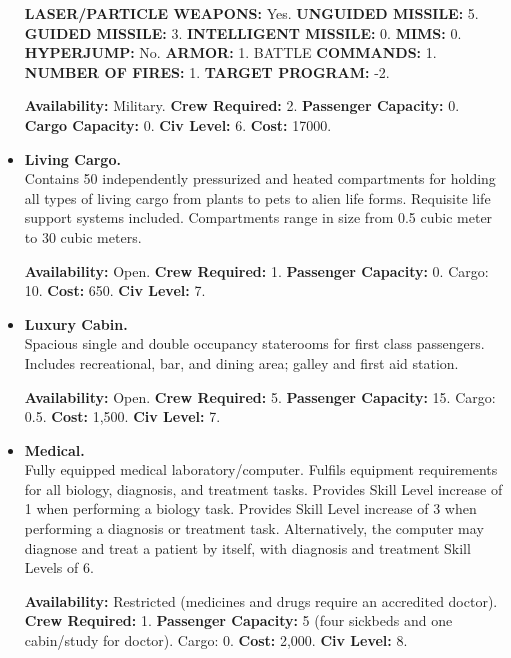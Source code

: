 \begin{itemize}
  \textbf{LASER/PARTICLE WEAPONS:} Yes. \textbf{UNGUIDED MISSILE:} 5.
  \textbf{GUIDED MISSILE:} 3.  \textbf{INTELLIGENT MISSILE:} 0.
  \textbf{MIMS:} 0.  \textbf{HYPERJUMP:} No. \textbf{ARMOR:} 1. BATTLE
  \textbf{COMMANDS:} 1. \textbf{NUMBER OF FIRES:} 1.  \textbf{TARGET
    PROGRAM:} -2.

  
  \textbf{Availability:} Military. \textbf{Crew Required:} 2.
  \textbf{Passenger Capacity:} 0.  \textbf{Cargo Capacity:} 0.
  \textbf{Civ Level:} 6. \textbf{Cost:} 17000.
  
  

\item\textbf{Living Cargo.}\\
  Contains 50 independently pressurized and heated compartments for
  holding all types of living cargo from plants to pets to alien life
  forms. Requisite life support systems included. Compartments range
  in size from 0.5 cubic meter to 30 cubic meters.

  
  \textbf{Availability:} Open. \textbf{Crew Required:} 1.
  \textbf{Passenger Capacity:} 0. Cargo: 10. \textbf{Cost:} 650.
  \textbf{Civ Level:} 7.
  
  

\item\textbf{Luxury Cabin.}\\
  Spacious single and double occupancy staterooms for first class
  passengers. Includes recreational, bar, and dining area; galley and
  first aid station.

  
  \textbf{Availability:} Open. \textbf{Crew Required:} 5.
  \textbf{Passenger Capacity:} 15. Cargo: 0.5. \textbf{Cost:} 1,500.
  \textbf{Civ Level:} 7.
  
  

\item\textbf{Medical.}\\
  Fully equipped medical laboratory/computer. Fulfils equipment
  requirements for all biology, diagnosis, and treatment tasks.
  Provides Skill Level increase of 1 when performing a biology task.
  Provides Skill Level increase of 3 when performing a diagnosis or
  treatment task. Alternatively, the computer may diagnose and treat a
  patient by itself, with diagnosis and treatment Skill Levels of 6.

  
  \textbf{Availability:} Restricted (medicines and drugs require an
  accredited doctor). \textbf{Crew Required:} 1. \textbf{Passenger
    Capacity:} 5 (four sickbeds and one cabin/study for doctor).
  Cargo: 0. \textbf{Cost:} 2,000. \textbf{Civ Level:} 8.
  

\end{itemize}
